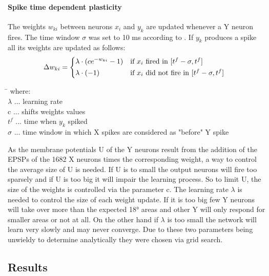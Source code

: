 \paragraph{Spike time dependent plasticity}
The weights $w_{ki}$ between neurons $x_i$ and $y_k$ are updated whenever a Y neuron fires. The time window $\sigma$ was set to 10 ms according to \citet{nessler}. If $y_k$ produces a spike all its weights are updated as follows:
\begin{equation}
\label{deltawki}
\Delta w_{ki} = \begin{dcases*} \lambda \cdot (ce^{-w_{ki}} - 1) & if $x_{i}$ fired in $ [t^f - \sigma, t^f] $ \\
\lambda \cdot (-1) & \text{if $ x_i $ did not fire in $ [t^f - \sigma, t^f] $ } \end{dcases*}
\end{equation}
\begin{tabbing}
\phantom{$c\ $}\= \kill
where:\> \\
$\lambda$\> ... learning rate \\
c\> ... shifts weights values \\
$t^f$\> ... time when $y_k$ spiked \\
$\sigma$ ... time window in which X spikes are considered as "before" Y spike
\end{tabbing}
As the membrane potentials U of the Y neurons result from the addition of the EPSPs of the 1682 X neurons times the corresponding weight, a way to control the average size of U is needed. If U is to small the output neurons will fire too sparsely and if U is too big it will impair the learning process. So to limit U, the size of the weights is controlled via the parameter c. The learning rate $\lambda$ is needed to control the size of each weight update. If it is too big few Y neurons will take over more than the expected 18° areas and other Y will only respond for smaller areas or not at all. On the other hand if $\lambda$ is too small the network will learn very slowly and may never converge. Due to these two parameters being unwieldy to determine analytically they were chosen via grid search. 


\subsection{Results}

